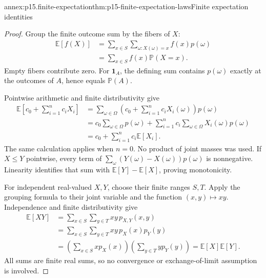 \begin{annexitem}{annex:p15.finite-expectation}{thm:p15-finite-expectation-laws}{Finite expectation identities}
\begin{proof}
Group the finite outcome sum by the fibers of \(X\):
\[
\begin{aligned}
 \mathbb E[f(X)]
 &=\sum_{x\in S}\sum_{\omega:X(\omega)=x}f(x)p(\omega)\\
 &=\sum_{x\in S}f(x)\mathbb P(X=x).
\end{aligned}
\]
Empty fibers contribute zero. For \(\mathbf1_A\), the defining sum
contains \(p(\omega)\) exactly at the outcomes of \(A\), hence equals
\(\mathbb P(A)\).

Pointwise arithmetic and finite distributivity give
\[
\begin{aligned}
 \mathbb E\left[c_0+\sum_{i=1}^n c_iX_i\right]
 &=\sum_{\omega\in\Omega}
      \left(c_0+\sum_{i=1}^n c_iX_i(\omega)\right)p(\omega)\\
 &=c_0\sum_{\omega\in\Omega}p(\omega)
     +\sum_{i=1}^n c_i\sum_{\omega\in\Omega}X_i(\omega)p(\omega)\\
 &=c_0+\sum_{i=1}^n c_i\mathbb E[X_i].
\end{aligned}
\]
The same calculation applies when \(n=0\). No product of joint masses
was used. If \(X\leq Y\) pointwise, every term of
\(\sum_\omega(Y(\omega)-X(\omega))p(\omega)\) is nonnegative.
Linearity identifies that sum with \(\mathbb E[Y]-\mathbb E[X]\),
proving monotonicity.

For independent real-valued \(X,Y\), choose their finite ranges \(S,T\).
Apply the grouping formula to their joint variable and the function
\((x,y)\mapsto xy\). Independence and finite distributivity give
\[
\begin{aligned}
 \mathbb E[XY]
 &=\sum_{x\in S}\sum_{y\in T}xy\,p_{X,Y}(x,y)\\
 &=\sum_{x\in S}\sum_{y\in T}xy\,p_X(x)p_Y(y)\\
 &=\left(\sum_{x\in S}x p_X(x)\right)
   \left(\sum_{y\in T}y p_Y(y)\right)
 =\mathbb E[X]\mathbb E[Y].
\end{aligned}
\]
All sums are finite real sums, so no convergence or exchange-of-limit
assumption is involved.
\end{proof}
\end{annexitem}

